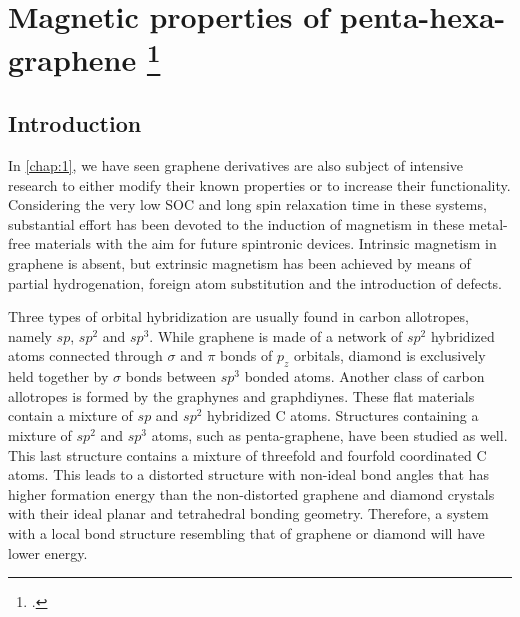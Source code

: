 \section[Magnetic properties of penta-hexa-graphene]{Magnetic properties of penta-hexa-graphene \footcite[This work is published:][]{Aierken2016.magnetism} \label{mag_phg}}

\subsection{Introduction}

In \autoref{chap:1}, we have seen graphene derivatives \cite{Vasilios2012,Inagaki2014} are also subject of intensive research to either modify their known properties or to increase their functionality. Considering the very low SOC and long spin relaxation time in these systems, substantial effort has been devoted to the induction of magnetism in these metal-free materials with the aim for future spintronic devices\cite{KAN2008,Kun2015}. Intrinsic magnetism in graphene is absent, but extrinsic magnetism has been achieved by means of partial hydrogenation\cite{Zhou2009,Eng2013}, foreign atom substitution\cite{Okada2001,Miao2016} and the introduction of defects\cite{Pereira2006,Yazyev2007}. 

Three types of orbital hybridization are usually found in carbon allotropes, namely $sp$, $sp^2$ and $sp^3$.  While graphene is made of a network of $sp^2$ hybridized atoms connected through $\sigma$ and $\pi$ bonds of $p_z$ orbitals, diamond is exclusively held together by $\sigma$ bonds between $sp^3$ bonded atoms. Another class of carbon allotropes is formed by the graphynes and graphdiynes\cite{Baughman1987,Ivanovskii20131}. These flat materials contain a mixture of $sp$ and $sp^2$ hybridized C atoms. Structures containing a mixture of $sp^2$ and $sp^3$ atoms, such as penta-graphene\cite{Zhang2015}, have been studied as well. This last structure contains a mixture of threefold and fourfold coordinated C atoms. This leads to a distorted structure with non-ideal bond angles that has higher formation energy than the non-distorted graphene and diamond crystals with their ideal planar and tetrahedral bonding geometry. Therefore, a system with a local bond structure resembling that of graphene or diamond will have lower energy. 


